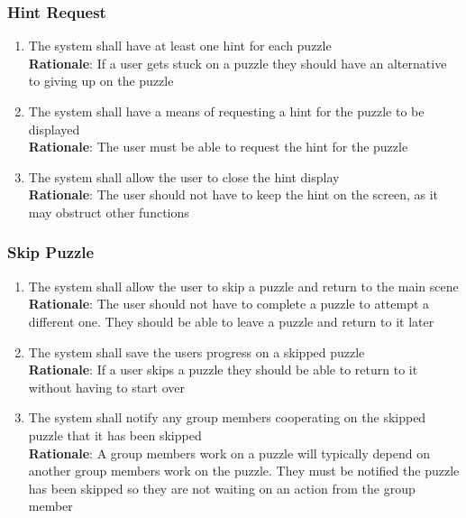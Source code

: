 \documentclass[12pt]{article}
\begin{document}
\subsubsection{Hint Request}
    \begin{enumerate}[label=HR\arabic*., series=HintRequest]
        \item The system shall have at least one hint for each puzzle\\
        \textbf{Rationale}: If a user gets stuck on a puzzle they should have an alternative to giving up on the puzzle
        \item The system shall have a means of requesting a hint for the puzzle to be displayed\\
        \textbf{Rationale}: The user must be able to request the hint for the puzzle
        \item The system shall allow the user to close the hint display\\
        \textbf{Rationale}: The user should not have to keep the hint on the screen, as it may obstruct other functions
    \end{enumerate}
\subsubsection{Skip Puzzle}
    \begin{enumerate}[label=SP\arabic*., series=SkipPuzzle]
        \item The system shall allow the user to skip a puzzle and return to the main scene\\
        \textbf{Rationale}: The user should not have to complete a puzzle to attempt a different one. They should be able to leave a puzzle and return to it later
        \item The system shall save the users progress on a skipped puzzle\\
        \textbf{Rationale}: If a user skips a puzzle they should be able to return to it without having to start over
        \item The system shall notify any group members cooperating on the skipped puzzle that it has been skipped\\
        \textbf{Rationale}: A group members work on a puzzle will typically depend on another group members work on the puzzle. They must be notified the puzzle has been skipped so they are not waiting on an action from the group member
    \end{enumerate}
\end{document}
